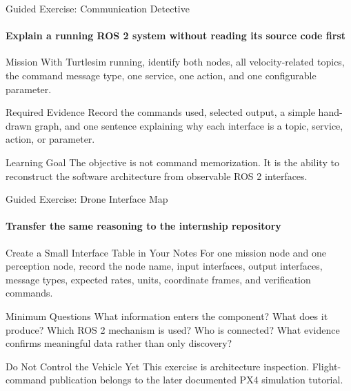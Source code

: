 \begin{frame}{Guided Exercise: Communication Detective}
\framesubtitle{Explain a running ROS 2 system without reading its source code first}
\begin{block}{Mission}
With Turtlesim running, identify both nodes, all velocity-related topics, the command message type, one service, one action, and one configurable parameter.
\end{block}
\begin{exampleblock}{Required Evidence}
Record the commands used, selected output, a simple hand-drawn graph, and one sentence explaining why each interface is a topic, service, action, or parameter.
\end{exampleblock}
\begin{alertblock}{Learning Goal}
The objective is not command memorization. It is the ability to reconstruct the software architecture from observable ROS 2 interfaces.
\end{alertblock}
\end{frame}

\begin{frame}{Guided Exercise: Drone Interface Map}
\framesubtitle{Transfer the same reasoning to the internship repository}
\begin{block}{Create a Small Interface Table in Your Notes}
For one mission node and one perception node, record the node name, input interfaces, output interfaces, message types, expected rates, units, coordinate frames, and verification commands.
\end{block}
\begin{exampleblock}{Minimum Questions}
What information enters the component? What does it produce? Which ROS 2 mechanism is used? Who is connected? What evidence confirms meaningful data rather than only discovery?
\end{exampleblock}
\begin{alertblock}{Do Not Control the Vehicle Yet}
This exercise is architecture inspection. Flight-command publication belongs to the later documented PX4 simulation tutorial.
\end{alertblock}
\end{frame}

